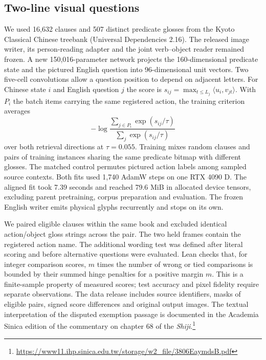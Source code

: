 \subsection*{Two-line visual questions}
We used 16,632 clauses and 507 distinct predicate glosses from the Kyoto Classical Chinese treebank (Universal Dependencies 2.16). The released image writer, its person-reading adapter and the joint verb--object reader remained frozen. A new 150,016-parameter network projects the 160-dimensional predicate state and the pictured English question into 96-dimensional unit vectors. Two five-cell convolutions allow a question position to depend on adjacent letters. For Chinese state $i$ and English question $j$ the score is $s_{ij}=\max_{t\leq L_j}\langle u_i,v_{jt}\rangle$. With $P_i$ the batch items carrying the same registered action, the training criterion averages
\[
-\log\frac{\sum_{j\in P_i}\exp(s_{ij}/\tau)}
                {\sum_j\exp(s_{ij}/\tau)}
\]
over both retrieval directions at $\tau=0.055$. Training mixes random clauses and pairs of training instances sharing the same predicate bitmap with different glosses. The matched control permutes pictured action labels among sampled source contexts. Both fits used 1,740 AdamW steps on one RTX 4090 D. The aligned fit took 7.39 seconds and reached 79.6 MiB in allocated device tensors, excluding parent pretraining, corpus preparation and evaluation. The frozen English writer emits physical glyphs recurrently and stops on its own.

We paired eligible clauses within the same book and excluded identical action/object gloss strings across the pair. The two held frames contain the registered action name. The additional wording test was defined after literal scoring and before alternative questions were evaluated. Lean checks that, for integer comparison scores, $m$ times the number of wrong or tied comparisons is bounded by their summed hinge penalties for a positive margin $m$. This is a finite-sample property of measured scores; test accuracy and pixel fidelity require separate observations. The data release includes source identifiers, masks of eligible pairs, signed score differences and original output images. The textual interpretation of the disputed exemption passage is documented in the Academia Sinica edition of the commentary on chapter 68 of the \textit{Shiji}.\footnote{\url{https://www11.ihp.sinica.edu.tw/storage/w2_file/3806EaymdsB.pdf}}
